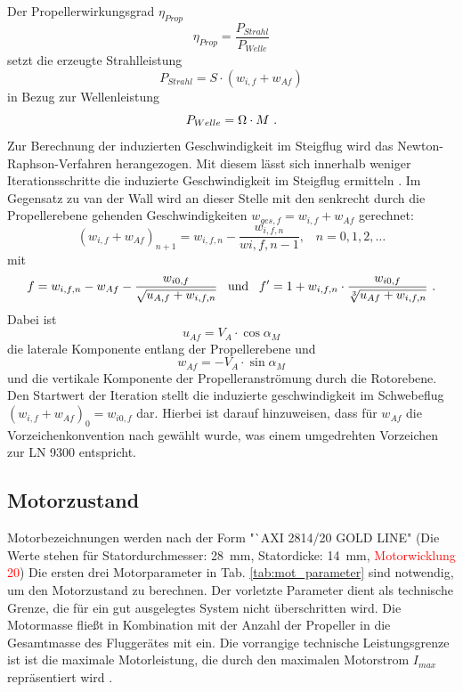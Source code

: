 Der Propellerwirkungsgrad \ensuremath{\eta_{Prop}} 
\begin{equation}
	\eta_{Prop} = \frac{P_{Strahl}}{P_{Welle}}
	\label{eq:eta_prop}
\end{equation}
setzt die erzeugte Strahlleistung 
\begin{equation}
	P_{Strahl} = S\cdot (w_{i,f}+ w_{Af})
	\label{eq:strahlleistung}
\end{equation}
in Bezug zur Wellenleistung
\begin{equation}
	P_{Welle} = \Omega \cdot M ~\text{.}
\end{equation} 
Zur Berechnung der induzierten Geschwindigkeit im Steigflug wird das Newton-Raphson-Verfahren herangezogen. Mit diesem lässt sich innerhalb weniger Iterationsschritte die induzierte Geschwindigkeit im Steigflug ermitteln \cite[S.153]{Wall.2015}. Im Gegensatz zu van der Wall wird an dieser Stelle mit den senkrecht durch die Propellerebene gehenden Geschwindigkeiten \ensuremath{w_{ges,f} = w_{i,f} + w_{Af}} gerechnet:
\begin{equation}
	(w_{i,f} + w_{Af})_{n+1} = w_{i,f,n} - \frac{w_{i,f,n}}{wi,f,n-1}, \;\;\; n = 0,1,2,\dots
\end{equation}
mit 
\begin{equation}
	f = w_{i,f,n} - w_{Af} - \frac{w_{i0,f}}{\sqrt{u_{A,f}+w_{i,f,n}}} \;\;\; \text{und} \;\;\; f'=1 + w_{i,f,n}\cdot\frac{w_{i0,f}}{\sqrt[3]{u_{Af}+w_{i,f,n}}} ~\text{.}
\end{equation}
Dabei ist 
\begin{equation}
	u_{Af} = V_{A}\cdot\cos\alpha_{M}
\end{equation}
die laterale Komponente entlang der Propellerebene und 
\begin{equation}
	w_{Af} = - V_{A}\cdot\sin\alpha_{M}
\end{equation}
und die vertikale Komponente der Propelleranströmung durch die Rotorebene. Den Startwert der Iteration stellt die induzierte geschwindigkeit im Schwebeflug \ensuremath{(w_{i,f}+w_{Af})_{0} = w_{i0,f}} dar. Hierbei ist darauf hinzuweisen, dass für \ensuremath{w_{Af}} die Vorzeichenkonvention nach \cite{Wall.2015} gewählt wurde, was einem umgedrehten Vorzeichen zur LN 9300 entspricht. 


\subsection{Motorzustand}
\label{subsec:motorzustand}
Motorbezeichnungen werden nach der Form "`AXI 2814/20 GOLD LINE"\; (Die Werte stehen für Statordurchmesser: \SI{28}{mm}, Statordicke: \SI{14}{mm}, \textcolor{red}{Motorwicklung 20}) 
Die ersten drei Motorparameter in Tab. \ref{tab:mot_parameter} sind notwendig, um den Motorzustand zu berechnen. Der vorletzte Parameter dient als technische Grenze, die für ein gut ausgelegtes System nicht überschritten wird. Die Motormasse fließt in Kombination mit der Anzahl der Propeller in die Gesamtmasse des Fluggerätes mit ein. Die vorrangige technische Leistungsgrenze ist ist die maximale Motorleistung, die durch den maximalen Motorstrom \ensuremath{I_{max}} repräsentiert wird \cite{axi}. 


